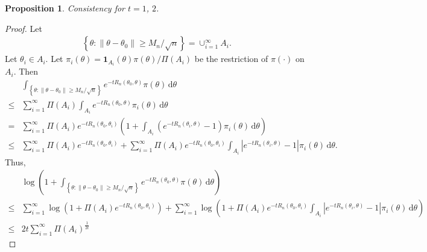 \documentclass[11pt]{article}
\theoremstyle{plain}
\newtheorem{proposition}{\quad\quad Proposition}
\theoremstyle{definition}
\theoremstyle{remark}
\begin{document}
\begin{appendices}
\begin{proposition}
    Consistency for $t =1 $, $2$.
    \label{newConsistency}
\end{proposition}
\begin{proof}
    Let 
    \begin{align*}
    \left\{ \theta: \|\theta - \theta_0\| \geq M_n /\sqrt n \right\}
    = \cup_{i=1}^\infty A_i.
    \end{align*}
    Let $\theta_i \in A_i$.
    Let $\pi_i (\theta)= \mathbf 1_{A_i}(\theta) \pi(\theta)/\Pi(A_i)$ be the restriction of $\pi(\cdot )$ on $A_i$.
    Then
    \begin{align*}
        &
        \int_{
    \left\{ \theta: \|\theta - \theta_0\| \geq M_n /\sqrt n \right\}
        }
        e^{-t R_n (\theta_0 , \theta)} \pi(\theta) \, \mathrm d \theta
        \\
        \leq
        &
        \sum_{i=1}^\infty
        \Pi(A_i)
        \int_{
            A_i
        }
        e^{-t R_n (\theta_0 , \theta)} \pi_i(\theta) \, \mathrm d \theta
        \\
        =
        &
        \sum_{i=1}^\infty
        \Pi(A_i)
e^{-t R_n (\theta_0 , \theta_i)}
\left( 
    1
+
        \int_{
            A_i
        }
        (e^{-t R_n (\theta_i, \theta)} -1) \pi_i(\theta) \, \mathrm d \theta
\right)
        \\
        \leq
        &
        \sum_{i=1}^\infty
        \Pi(A_i)
e^{-t R_n (\theta_0 , \theta_i)}
+
        \sum_{i=1}^\infty
        \Pi(A_i)
e^{-t R_n (\theta_0 , \theta_i)}
        \int_{
            A_i
        }
        |e^{-t R_n (\theta_i, \theta)} -1| \pi_i(\theta) \, \mathrm d \theta
        .
    \end{align*}
    Thus,
    \begin{align*}
        &
    \log
    \left(
        1+ 
        \int_{
    \left\{ \theta: \|\theta - \theta_0\| \geq M_n /\sqrt n \right\}
        }
        e^{-t R_n (\theta_0 , \theta)} \pi(\theta) \, \mathrm d \theta
    \right)
    \\
    \leq&
        \sum_{i=1}^\infty
        \log\left( 
        1+
        \Pi(A_i)
e^{-t R_n (\theta_0 , \theta_i)}
    \right)
+
        \sum_{i=1}^\infty
        \log\left( 
        1+
        \Pi(A_i)
e^{-t R_n (\theta_0 , \theta_i)}
        \int_{
            A_i
        }
        |e^{-t R_n (\theta_i, \theta)} -1| \pi_i(\theta) \, \mathrm d \theta
    \right)
    \\
    \leq &
        2 t
        \sum_{i=1}^\infty
        \Pi(A_i)^{\frac{1}{2t}}

\end{align*}
\end{proof}
\end{appendices}
\end{document}
